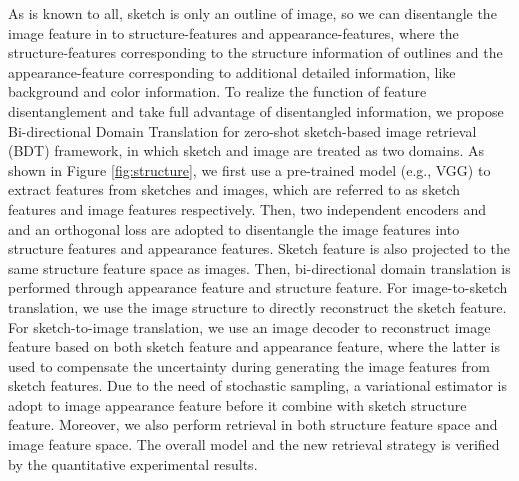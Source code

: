 \documentclass[10pt,twocolumn,letterpaper]{article}
\begin{document}
As is known to all, sketch is only an outline of image, so we can disentangle the image feature in to structure-features and appearance-features, where the structure-features corresponding to the structure information of outlines and the appearance-feature corresponding to additional detailed information, like background and color information. 
To realize the function of feature disentanglement and take full advantage of disentangled information, we propose Bi-directional Domain Translation for zero-shot sketch-based image retrieval (BDT) framework, in which sketch and image are treated as two domains. 
As shown in Figure \ref{fig:structure}, we first use a pre-trained model (e.g., VGG) to extract features from sketches and images, which are referred to as sketch features and image features respectively. 
Then, two independent encoders and and an orthogonal loss are adopted to disentangle the image features into structure features and appearance features.
Sketch feature is also projected to the same structure feature space as images. 
Then, bi-directional domain translation is performed through appearance feature and structure feature. 
For image-to-sketch translation, we use the image structure to directly reconstruct the sketch feature. 
For sketch-to-image translation, we use an image decoder to reconstruct image feature based on both sketch feature and appearance feature, where the latter is used to compensate the uncertainty during generating the image features from sketch features.
Due to the need of stochastic sampling, a variational estimator is adopt to image appearance feature before it combine with sketch structure feature. 
Moreover, we also perform retrieval in both structure feature space and image feature space. 
The overall model and the new retrieval strategy is verified by the quantitative experimental results. 
\end{document}
